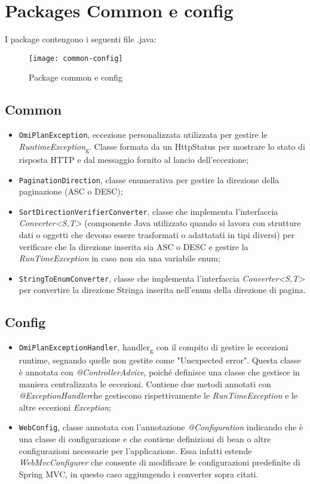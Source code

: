 \section{Packages Common e config}
I package contengono i seguenti file .java:

\begin{figure}[H] 
    \centering 
    \texttt{[image: common-config]} 
    \caption{Package common e config}
\end{figure}
\subsection{Common}
\begin{itemize}
\item \texttt{OmiPlanException}, eccezione personalizzata utilizzata per gestire le \textit{RuntimeException}\textsubscript{g}. Classe formata da un HttpStatus per mostrare lo stato di risposta HTTP e dal messaggio fornito al lancio dell'eccezione;
\item \texttt{PaginationDirection}, classe enumerativa per gestire la direzione della paginazione (ASC o DESC);
\item \texttt{SortDirectionVerifierConverter}, classe che implementa l'interfaccia \textit{Converter<S,T>} (componente Java utilizzato quando si lavora con strutture dati o oggetti che devono essere trasformati o adattatati in tipi diversi) per verificare che la direzione inserita sia ASC o DESC e gestire la \textit{RunTimeException} in caso non sia una variabile enum;
\item \texttt{StringToEnumConverter}, classe che implementa l'interfaccia \textit{Converter<S,T>} per convertire la direzione Stringa inserita nell'enum della direzione di pagina.
\end{itemize}

\subsection{Config}
\begin{itemize}
\item \texttt{OmiPlanExceptionHandler}, handler\textsubscript{g} con il compito di gestire le eccezioni runtime, segnando quelle non gestite come "Unexpected error". Questa classe è annotata con \textit{@ControllerAdvice}, poiché definisce una classe che gestisce in maniera centralizzata le eccezioni. Contiene due metodi annotati con \textit{@ExceptionHandler}che gestiscono rispettivamente le \textit{RunTimeException} e le altre eccezioni \textit{Exception};
\item \texttt{WebConfig}, classe annotata con l'annotazione \textit{@Configuration} indicando che è una classe di configurazione e che contiene definizioni di bean o altre configurazioni necessarie per l'applicazione. Essa infatti estende \textit{WebMvcConfigurer} che consente di modificare le configurazioni predefinite di Spring MVC, in questo caso aggiungendo i converter sopra citati.
\end{itemize}
